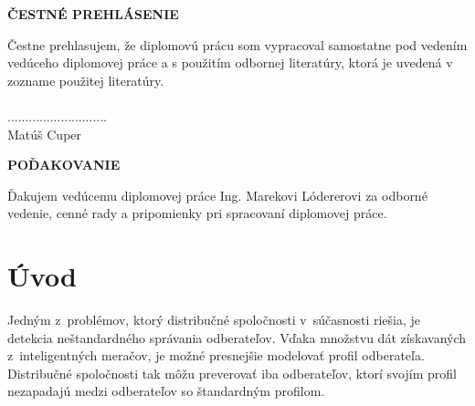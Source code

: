 \documentclass[a4paper,twoside,slovak,12pt]{article}
\begin{document}

\begin{titlepage}
\vspace*{15cm}
\begin{large}
  \noindent \textbf{ČESTNÉ PREHLÁSENIE} \par
\end{large}
\vspace*{0.5cm}
\noindent
Čestne prehlasujem, že diplomovú prácu som vypracoval samostatne pod vedením
vedúceho diplomovej práce a s použitím odbornej literatúry, ktorá je uvedená
v zozname použitej literatúry. \\
\vspace*{0.5cm}\\
\hspace*{10cm}............................\\
\hspace*{10.7cm} Matúš Cuper
\end{titlepage}

\begin{titlepage}
\vspace*{15cm}
\begin{large}
  \noindent \textbf{POĎAKOVANIE} \par
\end{large}
\vspace*{0.5cm}
\noindent
Ďakujem vedúcemu diplomovej práce Ing. Marekovi Lódererovi za odborné vedenie,
cenné rady a pripomienky pri spracovaní diplomovej práce.
\end{titlepage}


\newpage
\tableofcontents
\thispagestyle{empty}                                                           %


\newpage
\setcounter{page}{1}
\section{Úvod}
Jedným z~problémov, ktorý distribučné spoločnosti v~súčasnosti riešia,
je detekcia neštandardného správania odberateľov. Vďaka množstvu dát
získavaných z~inteligentných meračov, je možné presnejšie modelovať profil
odberateľa. Distribučné spoločnosti tak môžu preverovať iba odberateľov, ktorí
svojím profil nezapadajú medzi odberateľov so štandardným profilom.
\end{document}
